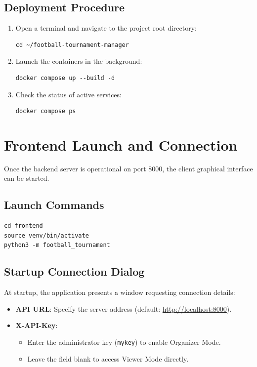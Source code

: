 \documentclass[11pt,a4paper]{article}
\begin{document}
\subsection*{Deployment Procedure}
\begin{enumerate}
    \item Open a terminal and navigate to the project root directory:
\begin{lstlisting}
cd ~/football-tournament-manager
\end{lstlisting}
    \item Launch the containers in the background:
\begin{lstlisting}
docker compose up --build -d
\end{lstlisting}
    \item Check the status of active services:
\begin{lstlisting}
docker compose ps
\end{lstlisting}
\end{enumerate}

\section{Frontend Launch and Connection}

Once the backend server is operational on port 8000, the client graphical interface can be started.

\subsection*{Launch Commands}
\begin{lstlisting}
cd frontend
source venv/bin/activate
python3 -m football_tournament
\end{lstlisting}

\subsection*{Startup Connection Dialog}
At startup, the application presents a window requesting connection details:
\begin{itemize}
    \item \textbf{API URL}: Specify the server address (default: \url{http://localhost:8000}).
    \item \textbf{X-API-Key}:
    \begin{itemize}
        \item Enter the administrator key (\texttt{mykey}) to enable Organizer Mode.
        \item Leave the field blank to access Viewer Mode directly.
    \end{itemize}
\end{itemize}
\end{document}
